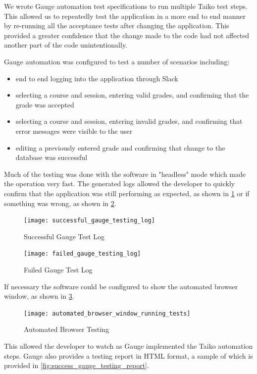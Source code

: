 We wrote Gauge automation test specifications to run multiple Taiko test steps. This allowed us to repeatedly test the application in a more end to end manner by re-running all the acceptance tests after changing the application. This provided a greater confidence that the change made to the code had not affected another part of the code unintentionally.

Gauge automation was configured to test a number of scenarios including:

\begin{itemize}
	\item end to end logging into the application through Slack
	\item selecting a course and session, entering valid grades, and confirming that the grade was accepted
	\item selecting a course and session, entering invalid grades, and confirming that error messages were visible to the user
	\item editing a previously entered grade and confirming that change to the database was successful
\end{itemize}


Much of the testing was done with the software in "headless" mode which made the operation very fast. The generated logs allowed the developer to quickly confirm that the application was still performing as expected, as shown in \cref{fig:success_gauge} or if something was wrong, as shown in \cref{fig:fail_gauge}.

\begin{figure}[H]
	\label{fig:success_gauge}
	\caption{Successful Gauge Test Log}
	\texttt{[image: successful\_gauge\_testing\_log]}
\end{figure}

\begin{figure}[H]
	\label{fig:fail_gauge}
	\caption{Failed Gauge Test Log}
	\texttt{[image: failed\_gauge\_testing\_log]}
\end{figure}

If necessary the software could be configured to show the automated browser window, as shown in \cref{fig:autobrowser}.

\begin{figure}[H]
	\label{fig:autobrowser}
	\caption{Automated Browser Testing}
	\texttt{[image: automated\_browser\_window\_running\_tests]}
\end{figure}

This allowed the developer to watch as Gauge implemented the Taiko automation steps. Gauge also provides a testing report in HTML format, a sample of which is provided in \cref{fig:success_gauge_testing_report}. 


